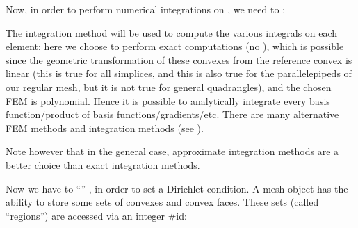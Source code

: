 \documentclass[a4paper,11pt,english]{sphinxmanual}
\begin{document}
\sphinxAtStartPar
Now, in order to perform numerical integrations on , we need to :

\begin{sphinxVerbatim}[commandchars=\\\{\}]
\end{sphinxVerbatim}

\sphinxAtStartPar
The integration method will be used to compute the various integrals on each
element: here we choose to perform exact computations (no ), which is possible since the geometric transformation of these convexes
from the reference convex is linear (this is true for all simplices, and this is
also true for the parallelepipeds of our regular mesh, but it is not true for
general quadrangles), and the chosen FEM is polynomial. Hence it is possible to
analytically integrate every basis function/product of basis
functions/gradients/etc. There are many alternative FEM methods and integration
methods (see ).

\sphinxAtStartPar
Note however that in the general case, approximate integration methods are a
better choice than exact integration methods.

\sphinxAtStartPar
Now we have to  “” , in order to
set a Dirichlet condition. A mesh object has the ability to store some sets of
convexes and convex faces. These sets (called “regions”) are accessed via an
integer \#id:
\end{document}
